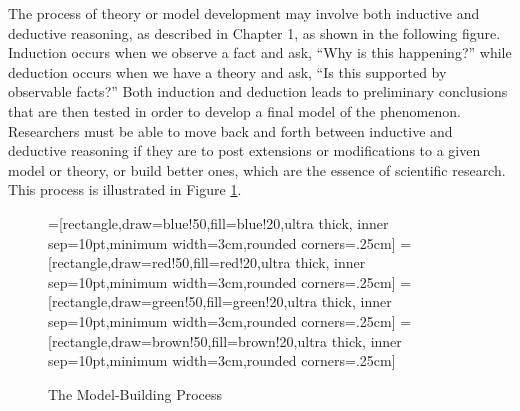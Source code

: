 The process of theory or model development may involve both inductive and deductive reasoning, as described in Chapter 1, as shown in the following figure. Induction occurs when we observe a fact and ask, ``Why is this happening?'' while deduction occurs when we have a theory and ask, ``Is this supported by observable facts?'' Both induction and deduction leads to preliminary conclusions that are then tested in order to develop a final model of the phenomenon. Researchers must be able to move back and forth between inductive and deductive reasoning if they are to post extensions or modifications to a given model or theory, or build better ones, which are the essence of scientific research. This process is illustrated in Figure \ref{02:fig04}.

\begin{center}
	\begin{figure}[H]
		=[rectangle,draw=blue!50,fill=blue!20,ultra thick,
		inner sep=10pt,minimum width=3cm,rounded corners=.25cm]
		=[rectangle,draw=red!50,fill=red!20,ultra thick,
		inner sep=10pt,minimum width=3cm,rounded corners=.25cm]
		=[rectangle,draw=green!50,fill=green!20,ultra thick,
		inner sep=10pt,minimum width=3cm,rounded corners=.25cm]
		=[rectangle,draw=brown!50,fill=brown!20,ultra thick,
		inner sep=10pt,minimum width=3cm,rounded corners=.25cm]
		\caption{The Model-Building Process}
		\label{02:fig04}
	\end{figure}
\end{center}

